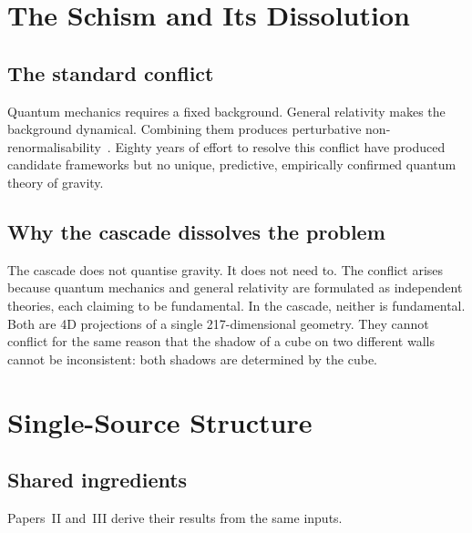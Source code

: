 \documentclass[12pt,a4paper]{article}
\begin{document}
\tableofcontents
\newpage

\section{The Schism and Its Dissolution}\label{sec:the-schism-and-its-dissolution}

\subsection{The standard conflict}

Quantum mechanics requires a fixed background. General relativity makes the
background dynamical. Combining them produces perturbative
non-renormalisability~\cite{goroff}. Eighty years of effort to resolve this
conflict have produced candidate frameworks but no unique, predictive,
empirically confirmed quantum theory of gravity.

\subsection{Why the cascade dissolves the problem}

The cascade does not quantise gravity. It does not need to. The conflict
arises because quantum mechanics and general relativity are formulated as
independent theories, each claiming to be fundamental. In the cascade,
neither is fundamental. Both are 4D projections of a single 217-dimensional
geometry. They cannot conflict for the same reason that the shadow of a cube
on two different walls cannot be inconsistent: both shadows are determined by
the cube.

\section{Single-Source Structure}\label{sec:single-source-structure}

\subsection{Shared ingredients}

Papers~II and~III derive their results from the same inputs.
\end{document}
